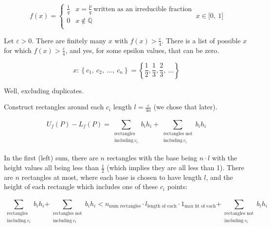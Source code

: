 \documentclass[12pt]{article}
\theoremstyle{plain}
\theoremstyle{remark}
\theoremstyle{definition}
\begin{document}
\[f(x) = \left\{ \begin{matrix}
\frac{1}{q} & x = \frac{p}{q}\ \text{written\ as\ an\ irreducible\ fraction} \\
0 & x\mathbb{\notin Q} \\
\end{matrix} \right.\ {x \in \lbrack 0,\ 1\rbrack}\]


Let \(\varepsilon > 0\). There are finitely many \(x\) with
\(f(x) > \frac{\varepsilon}{4}\). There is a list of possible \(x\) for
which \(f(x) > \frac{\varepsilon}{4}\), and yes, for some epsilon
values, that can be zero.

\[x:\left\{ c_{1},\ c_{2},\ \ldots,\ c_{n} \right\} = \left\{ \frac{1}{2},\frac{1}{3},\frac{2}{3},\ \ldots \right\}\]

Well, excluding duplicates.

Construct rectangles around each \(c_{i}\) length
\(l = \frac{\varepsilon}{4n}\) (we chose that later).

\[U_{f}(P) - L_{f}(P) = \sum_{\begin{matrix}
\text{rectangles\ } \\
\text{including}\ c_{i} \\
\end{matrix}}^{}{b_{i}h_{i}} + \sum_{\begin{matrix}
\text{rectangles\ not} \\
\text{including}\ c_{i} \\
\end{matrix}}^{}{b_{i}h_{i}}\]

In the first (left) sum, there are \(n\) rectangles with the base being
\(n \cdot l\) with the height values all being less than \(\frac{1}{2}\)
(which implies they are all less than 1). There are \(n\) rectangles at
most, where each base is chosen to have length \(l\), and the height of
each rectangle which includes one of these \(c_{i}\) points:

\[{\sum_{\begin{matrix}
\text{rectangles\ } \\
\text{including}\ c_{i} \\
\end{matrix}}^{}{b_{i}h_{i}} }{+ \sum_{\begin{matrix}
\text{rectangles\ not} \\
\text{including}\ c_{i} \\
\end{matrix}}^{}{b_{i}h_{i}} }{< n_{\text{num\ rectangles}} \cdot l_{\text{length\ of\ each}} \cdot 1_{\text{max\ ht\ of\ each}} }{+ \sum_{\begin{matrix}
\text{rectangles\ not} \\
\text{including}\ c_{i} \\
\end{matrix}}^{}{b_{i}h_{i}}} \]
\end{document}
